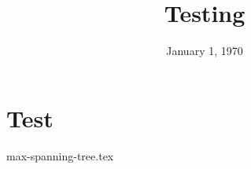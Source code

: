 \documentclass[11pt]{exam}
\title{Testing}
\date{January 1, 1970}
\begin{document}
\maketitle

\section{Test}
\begin{questions}
{max-spanning-tree.tex}
\end{questions}
\end{document}

